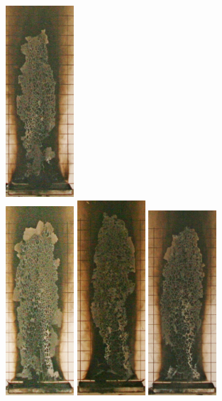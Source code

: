 \documentclass[twoside]{uocthesis}
\begin{document}
{\begin{figure}[p]
	\includegraphics[width=1.0in]{../Figures/GBGAS_17_IMG_5875}	\\

	\includegraphics[width=1.0in]{../Figures/GBGAS_18_IMG_5895}
	\includegraphics[width=1.0in]{../Figures/GBGAS_19_IMG_5967}
	\includegraphics[width=1.0in]{../Figures/GBGAS_20_IMG_5986}

\end{figure}}
\end{document}

